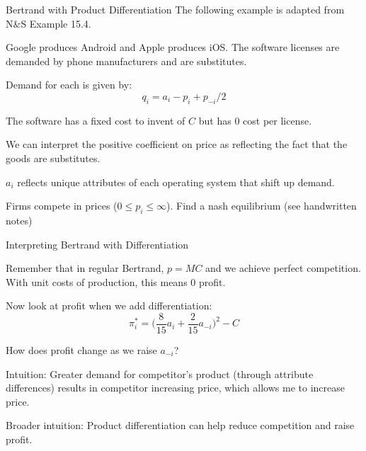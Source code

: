 \documentclass[aspectratio=169]{beamer}
\newenvironment{wideitemize}{\itemize\addtolength{\itemsep}{10pt}}{\enditemize}
\begin{document}
\begin{frame}{Bertrand with Product Differentiation}
The following example is adapted from N\&S Example 15.4.
\begin{wideitemize}
    \item Google produces Android and Apple produces iOS. The software licenses are demanded by phone manufacturers and are substitutes.
    \item Demand for each is given by:
    \[q_i = a_i - p_i + p_{-i}/2\]
    \item The software has a fixed cost to invent of $C$ but has 0 cost per license.
    \item We can interpret the positive coefficient on price as reflecting the fact that the goods are substitutes.
    \item $a_i$ reflects unique attributes of each operating system that shift up demand.
    \item Firms compete in prices ($0\leq p_i \leq \infty$). Find a nash equilibrium (see handwritten notes)
\end{wideitemize}
    
\end{frame}


\begin{frame}{Interpreting Bertrand with Differentiation}

\begin{wideitemize}
    \item Remember that in regular Bertrand, $p=MC$ and we achieve perfect competition. With unit costs of production, this means 0 profit.
    \item Now look at profit when we add differentiation:
\[\pi_i^* = \bigg (\frac{8}{15}a_i + \frac{2}{15} a_{-i} \bigg )^2-C\]
\item How does profit change as we raise $a_{-i}$?\pause
\item Intuition: Greater demand for competitor's product (through attribute differences) results in competitor increasing price, which allows me to increase price.
\item Broader intuition: Product differentiation can help reduce competition and raise profit.
\end{wideitemize}


\end{frame}
\end{document}

